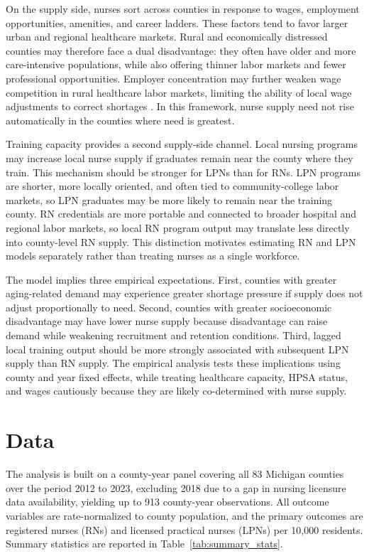 \documentclass[12pt]{article}
\begin{document}
On the supply side, nurses sort across counties in response to wages, employment opportunities, amenities, and career ladders. These factors tend to favor larger urban and regional healthcare markets. Rural and economically distressed counties may therefore face a dual disadvantage: they often have older and more care-intensive populations, while also offering thinner labor markets and fewer professional opportunities. Employer concentration may further weaken wage competition in rural healthcare labor markets, limiting the ability of local wage adjustments to correct shortages \citep{staiger2010}. In this framework, nurse supply need not rise automatically in the counties where need is greatest.

Training capacity provides a second supply-side channel. Local nursing programs may increase local nurse supply if graduates remain near the county where they train. This mechanism should be stronger for LPNs than for RNs. LPN programs are shorter, more locally oriented, and often tied to community-college labor markets, so LPN graduates may be more likely to remain near the training county. RN credentials are more portable and connected to broader hospital and regional labor markets, so local RN program output may translate less directly into county-level RN supply. This distinction motivates estimating RN and LPN models separately rather than treating nurses as a single workforce.

The model implies three empirical expectations. First, counties with greater aging-related demand may experience greater shortage pressure if supply does not adjust proportionally to need. Second, counties with greater socioeconomic disadvantage may have lower nurse supply because disadvantage can raise demand while weakening recruitment and retention conditions. Third, lagged local training output should be more strongly associated with subsequent LPN supply than RN supply. The empirical analysis tests these implications using county and year fixed effects, while treating healthcare capacity, HPSA status, and wages cautiously because they are likely co-determined with nurse supply.

\FloatBarrier
\section{Data}\label{sec:data}

The analysis is built on a county-year panel covering all 83 Michigan counties over the period 2012 to 2023, excluding 2018 due to a gap in nursing licensure data availability, yielding up to 913 county-year observations. All outcome variables are rate-normalized to county population, and the primary outcomes are registered nurses (RNs) and licensed practical nurses (LPNs) per 10{,}000 residents. Summary statistics are reported in Table~\ref{tab:summary_stats}.
\end{document}

